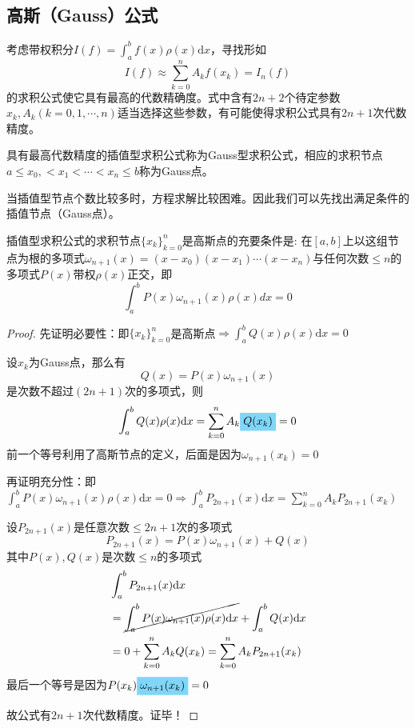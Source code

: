 \subsection{高斯（Gauss）公式}
考虑带权积分$I(f)=\int_{a}^{b}f(x)\rho(x)\mathrm{d}x$，寻找形如
\[
    I(f)\approx\sum_{k=0}^nA_kf(x_k)=I_n(f)    
\]
的求积公式使它具有最高的代数精确度。式中含有$2n+2$个待定参数$x_k,A_k(k= 0,1,\cdots,n)$适当选择这些参数，有可能使得求积公式具有$2n+1$次代数精度。
\begin{definition}[Gauss型求积公式]
    具有最高代数精度的插值型求积公式称为Gauss型求积公式，相应的求积节点$a\leqslant x_0, < x_1 <\cdots< x_n\leqslant b$称为Gauss点。
\end{definition}
当插值型节点个数比较多时，方程求解比较困难。因此我们可以先找出满足条件的插值节点（Gauss点）。
\begin{theorem}
    插值型求积公式的求积节点$\{x_k\}_{k = 0}^{n}$是高斯点的充要条件是: 在$[a,b]$上以这组节点为根的多项式$\omega_{n+1}(x)=(x-x_{0})(x-x_{1})\cdots(x-x_{n})$与任何次数$\leqslant n$的多项式$P(x)$带权$\rho(x)$正交，即
    \[
        \int_a^bP(x)\omega_{n+1}(x)\rho(x)dx=0
    \]
\end{theorem}
\begin{proof}
    先证明必要性：即$\{x_k\}_{k = 0}^{n}$是高斯点$\Rightarrow \int_{a}^{b}Q(x)\rho(x)\mathrm{d}x = 0$

    设$x_k$为Gauss点，那么有
    \[
        Q(x) = P(x)\omega_{n+1}(x)
    \]
    是次数不超过$(2n+1)$次的多项式，则
    \[
        \int_{a}^{b}Q(x)\rho(x)\mathrm{d}x = \sum_{k = 0}^{n}A_{k}\colorbox{cyan!50}{$Q(x_k)$} = 0
    \]
    前一个等号利用了高斯节点的定义，后面是因为$\omega_{n+1}(x_k) = 0$

    再证明充分性：即$\int_{a}^{b}P(x)\omega_{n+1}(x)\rho(x)\mathrm{d}x = 0\Rightarrow \int_{a}^{b}P_{2n+1}(x)\mathrm{d}x = \sum_{k = 0}^{n}A_kP_{2n+1}(x_{k})$

    设$P_{2n+1}(x)$是任意次数$\leqslant 2n+1$次的多项式
    \[
        P_{2n+1}(x) = P(x)\omega_{n+1}(x)+Q(x)        
    \]
    其中$P(x),Q(x)$是次数$\leqslant n$的多项式
    \[
        \begin{aligned}
            & \int_{a}^{b}P_{2n+1}(x)\mathrm{d}x\\
            & =\cancel{\int_{a}^{b}P(x)\omega_{n+1}(x)\rho(x)\mathrm{d}x}+\int_{a}^{b}Q(x) \mathrm{d}x\\
            &=0+\sum_{k = 0}^{n}A_kQ(x_{k}) = \sum_{k = 0}^{n}A_kP_{2n+1}(x_{k})
        \end{aligned}
    \]
    最后一个等号是因为$P(x_k)\colorbox{cyan!50}{$\omega_{n+1}(x_k)$} = 0$

    故公式有$2n+1$次代数精度。证毕！
\end{proof}
